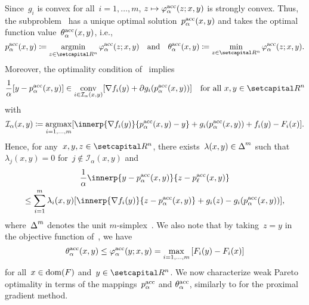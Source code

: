 \documentclass[../main]{subfiles}
\begin{document}
Since~$g_i$ is convex for all~$i = 1, \dots, m$, $z \mapsto \varphi^{\mathrm{acc}}_\alpha(z; x, y)$ is strongly convex.
Thus, the subproblem~ has a unique optimal solution~$p^{\mathrm{acc}}_\alpha(x, y)$ and takes the optimal function value~$\theta^{\mathrm{acc}}_\alpha(x, y)$, i.e.,
\begin{equation} \label{eq:acc_pgm_optimal_function}
    p^\acc_\alpha(x, y) \coloneqq \argmin_{z \in \setR^n} \varphi^\acc_\alpha(z; x, y) \eqand \theta^\acc_\alpha(x, y) \coloneqq \min_{z \in \setR^n} \varphi^\acc_\alpha(z; x, y)
.\end{equation}
Moreover, the optimality condition of~ implies
\begin{equation}
    \frac{1}{\alpha} [ y - p^\acc_\alpha(x, y) ] \in \conv_{i \in \mathcal{I}_\alpha(x, y)} [ \nabla f_i(y) + \partial g_i(p^\acc_\alpha(x, y)) ] \forallcondition{x, y \in \setR^n}
\end{equation}
with
\begin{equation} \label{eq:acc_pgm_active}
    \mathcal{I}_\alpha(x, y) \coloneqq \argmax_{i = 1, \dots, m} [ \innerp{\nabla f_i(y)}{p^\acc_\alpha(x, y) - y} + g_i(p^\acc_\alpha(x, y)) + f_i(y) - F_i(x) ]
.\end{equation}
Hence, for any~$x, y, z \in \setR^n$, there exists~$\lambda(x, y) \in \operatorname{\Delta}^m$ such that~$\lambda_j(x, y) = 0$ for~$j \notin \mathcal{I}_\alpha(x, y)$ and
\begin{multline} \label{eq:acc_pgm_opt}
    \frac{1}{\alpha} \innerp{y - p^\acc_\alpha(x, y)}{z - p^\acc_\ell(x, y)} \\
    \le \sum_{i = 1}^{m} \lambda_i(x, y) [\innerp{\nabla f_i(y)}{z - p^\acc_\alpha(x, y)} + g_i(z) - g_i(p^\acc_\alpha(x, y))]
,\end{multline}
where~$\operatorname{\Delta}^m$ denotes the unit $m$-simplex~.
We also note that by taking~$z = y$ in the objective function of~, we have
\begin{equation} \label{eq:acc_pgm_opt_triv}
    \theta^{\mathrm{acc}}_\alpha(x, y) \le \varphi^{\mathrm{acc}}_\alpha(y; x, y) = \max_{i = 1, \dots, m}\left[ F_i(y) - F_i(x) \right]
\end{equation}
for all~$x \in \operatorname{dom}(F)$ and~$y \in \setR^n$.
We now characterize weak Pareto optimality in terms of the mappings~$p^{\mathrm{acc}}_\alpha$ and $\theta^{\mathrm{acc}}_\alpha$, similarly to  for the proximal gradient method.
\end{document}
